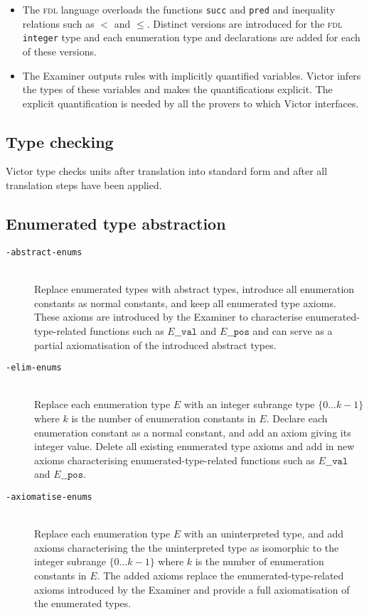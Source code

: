 \documentclass[12pt,fleqn]{article}
\newcommand{\fdl}{\textsc{fdl}}
\newcommand{\optionb}[1]{\item[\texttt{-{#1}}]\ \\}
\begin{document}
\begin{itemize}
\item The \fdl{} language overloads the functions \texttt{succ} and
  \texttt{pred} and inequality relations such as $<$ and $\leq$.
  Distinct versions are introduced for the \fdl{} \texttt{integer} type
  and each enumeration type and declarations are added for each of
  these versions.

\item The Examiner outputs rules with implicitly quantified variables.
  Victor infers the types of these variables and makes the
  quantifications explicit.  The explicit quantification is needed by
  all the provers to which Victor interfaces.

\end{itemize}


\subsection{Type checking}

Victor type checks units after translation into standard form
and after all translation steps have been applied.


\subsection{Enumerated type abstraction}

\begin{description}
\optionb{abstract-enums} 
  Replace enumerated types with abstract types, introduce all
  enumeration constants as normal constants, and keep all enumerated
  type axioms.  
  These axioms are introduced by the Examiner to
  characterise enumerated-type-related functions such as
  $\mathit{E}\mathtt{\_\_val}$ and $\mathit{E}\mathtt{\_\_pos}$ and
  can serve as a partial axiomatisation of the introduced
  abstract types.

\optionb{elim-enums}      
  Replace each enumeration type $E$ with an integer subrange type $\{0
  \ldots k - 1 \}$ where $k$ is the number of enumeration constants in
  $E$.
  Declare each enumeration constant as a normal constant, and add an axiom
  giving its integer value.
  Delete all existing enumerated type axioms and add in new axioms
  characterising enumerated-type-related functions such as 
  $\mathit{E}\mathtt{\_\_val}$ and  $\mathit{E}\mathtt{\_\_pos}$.

\optionb{axiomatise-enums}
  Replace each enumeration type $E$ with an uninterpreted type, and add
  axioms characterising the the uninterpreted type as isomorphic to the
  integer subrange $\{0 \ldots k - 1 \}$ where $k$ is the number of
  enumeration constants in $E$.
  The added axioms replace the enumerated-type-related axioms
  introduced by the Examiner and provide a full axiomatisation of
  the enumerated types.

\end{description}
\end{document}
